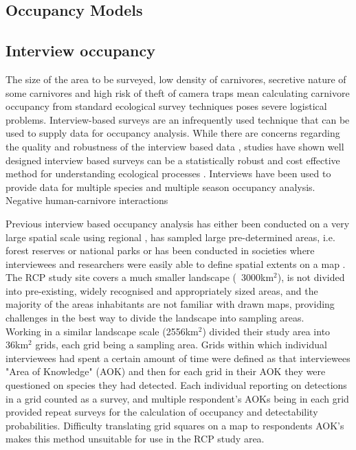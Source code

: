 \subsection{Occupancy Models}

\subsection{Interview occupancy}

The size of the area to be surveyed, low density of carnivores, secretive nature of some carnivores and high risk of theft of camera traps mean calculating carnivore occupancy from standard ecological survey techniques poses severe logistical problems. Interview-based surveys are an infrequently used technique that can be used to supply data for occupancy analysis. While there are concerns regarding the quality and robustness of the interview based data \cite{Sheil_2004}, studies have shown well designed interview based surveys can be a statistically robust and cost effective method for understanding ecological processes \cite{Meijaard_2011,Polfus_2013,Gros_1996}. Interviews have been used to provide data for multiple species \cite{Karanth_2009,Zeller_2011} and multiple season \cite{Pillay_2011} occupancy analysis.\\


Negative human-carnivore interactions 





Previous interview based occupancy analysis has either been conducted on a very large spatial scale using regional \cite{Karanth_2009}, has sampled large pre-determined areas, i.e. forest reserves or national parks \cite{Pillay_2011,Pillay_2013,brittain2013} or has been conducted in societies where interviewees and researchers were easily able to define spatial extents on a map \cite{Taubmann_2015,Zeller_2011,Petracca_2013}. The RCP study site covers a much smaller landscape (~3000km$^2$), is not divided into pre-existing, widely recognised and appropriately sized areas, and the majority of the areas inhabitants are not familiar with drawn maps, providing challenges in the best way to divide the landscape into sampling areas.\\

Working in a similar landscape scale (2556km$^2$) \citet{Zeller_2011} divided their study area into 36km$^2$ grids, each grid being a sampling area. Grids within which individual interviewees had spent a certain amount of time were defined as that interviewees "Area of Knowledge" (AOK) and then for each grid in their AOK they were questioned on species they had detected. Each individual reporting on detections in a grid counted as a survey, and multiple respondent's AOKs being in each grid provided repeat surveys for the calculation of occupancy and detectability probabilities. Difficulty translating grid squares on a map to respondents AOK's makes this method unsuitable for use in the RCP study area.\\

